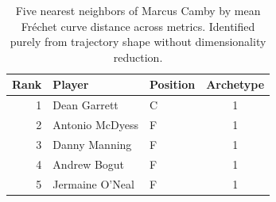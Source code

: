 \begin{table}[htbp]
  \centering\small
  \begin{tabular}{rllc}
    \toprule
    Rank & Player & Position & Archetype \\
    \midrule
    1 & Dean Garrett & C & 1 \\
    2 & Antonio McDyess & F & 1 \\
    3 & Danny Manning & F & 1 \\
    4 & Andrew Bogut & F & 1 \\
    5 & Jermaine O'Neal & F & 1 \\
    \bottomrule
  \end{tabular}
  \caption{Five nearest neighbors of Marcus Camby by mean Fr\'{e}chet curve distance across metrics. Identified purely from trajectory shape without dimensionality reduction.}
  \label{tab:Marcus_Camby_frechet_curve_neighbors}
\end{table}

